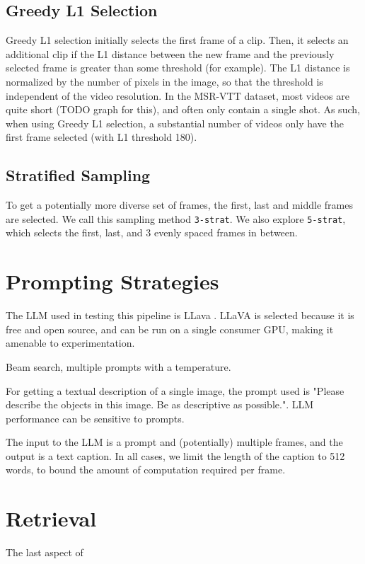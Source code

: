 \documentclass{article}
\begin{document}
\subsection{Greedy L1 Selection}
Greedy L1 selection initially selects the first frame of a clip. Then, it selects an additional clip if the L1 distance between the new frame and the previously selected frame is greater than some threshold (for example).
The L1 distance is normalized by the number of pixels in the image, so that the threshold is independent of the video resolution.
In the MSR-VTT dataset, most videos are quite short (TODO graph for this), and often only contain a single shot.
As such, when using Greedy L1 selection, a substantial number of videos only have the first frame selected (with L1 threshold 180).

\subsection{Stratified Sampling}
To get a potentially more diverse set of frames, the first, last and middle frames are selected.
We call this sampling method \verb|3-strat|. We also explore \verb|5-strat|, which selects the first, last, and 3 evenly spaced frames in between.

\section{Prompting Strategies}

The LLM used in testing this pipeline is LLava \cite{llava}.
LLaVA is selected because it is free and open source, and can be run on a single consumer GPU, making it amenable to experimentation.

Beam search, multiple prompts with a temperature.

For getting a textual description of a single image, the prompt used is "Please describe the objects in this image. Be as descriptive as possible.".
LLM performance can be sensitive to prompts.

The input to the LLM is a prompt and (potentially) multiple frames, and the output is a text caption.
In all cases, we limit the length of the caption to 512 words, to bound the amount of computation required per frame.

\section{Retrieval}

The last aspect of 
\end{document}

